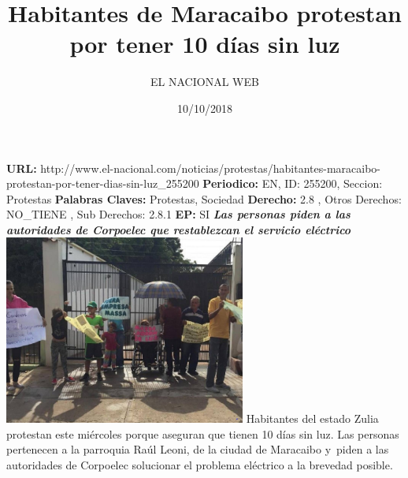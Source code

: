\documentclass{article}%
\title{\textbf{Habitantes de Maracaibo protestan por tener 10 días sin luz}}%
\author{EL NACIONAL WEB}%
\date{10/10/2018}%
\begin{document}
%
\normalsize%
\maketitle%
\textbf{URL: }%
http://www.el{-}nacional.com/noticias/protestas/habitantes{-}maracaibo{-}protestan{-}por{-}tener{-}dias{-}sin{-}luz\_255200\newline%
%
\textbf{Periodico: }%
EN, %
ID: %
255200, %
Seccion: %
Protestas\newline%
%
\textbf{Palabras Claves: }%
Protestas, Sociedad\newline%
%
\textbf{Derecho: }%
2.8%
, Otros Derechos: %
NO\_TIENE%
, Sub Derechos: %
2.8.1%
\newline%
%
\textbf{EP: }%
SI\newline%
\newline%
%
\textbf{\textit{Las personas piden a las autoridades de Corpoelec que restablezcan el servicio eléctrico~}}%
\newline%
\newline%
%
\includegraphics[width=300px]{18.jpg}%
\newline%
%
Habitantes del estado Zulia protestan este miércoles porque aseguran que tienen 10 días sin luz.%
\newline%
%
Las personas pertenecen a la parroquia Raúl Leoni, de la ciudad de Maracaibo y~piden a las autoridades de Corpoelec solucionar el problema eléctrico a la brevedad posible.%
\newline%
%
\end{document}
